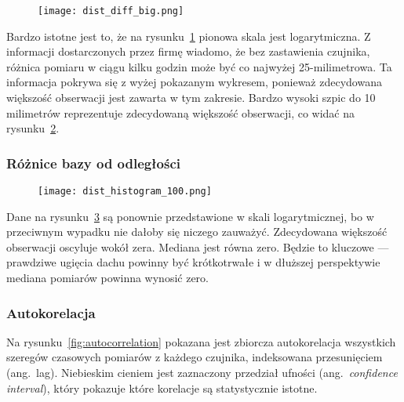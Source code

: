 \begin{figure}[h]
    \centering
    \texttt{[image: dist\_diff\_big.png]}
    \label{fig:distbig}
\end{figure}

Bardzo istotne jest to, że na rysunku~\ref{fig:distbig} pionowa skala jest logarytmiczna.
Z informacji dostarczonych przez firmę wiadomo, że bez zastawienia czujnika, różnica pomiaru w ciągu kilku godzin może być co najwyżej 25-milimetrowa.
Ta informacja pokrywa się z wyżej pokazanym wykresem, ponieważ zdecydowana większość obserwacji jest zawarta w tym zakresie.
Bardzo wysoki szpic do 10 milimetrów reprezentuje zdecydowaną większość obserwacji, co widać na rysunku~\ref{fig:diffsmall}.


\begin{figure}[h]
    \centering
    
    \label{fig:diffsmall}
\end{figure}

\subsubsection{Różnice bazy od odległości}
\begin{figure}[h]
    \texttt{[image: dist\_histogram\_100.png]}
    \label{fig:dist}
\end{figure}


Dane na rysunku~\ref{fig:dist} są ponownie przedstawione w skali logarytmicznej, bo w przeciwnym wypadku nie dałoby się niczego zauważyć.
Zdecydowana większość obserwacji oscyluje wokół zera.
Mediana jest równa zero.
Będzie to kluczowe — prawdziwe ugięcia dachu powinny być krótkotrwałe i w dłuższej perspektywie mediana pomiarów powinna wynosić zero.

\subsubsection{Autokorelacja}\label{subsubsec:autocorrelation}

Na rysunku~\ref{fig:autocorrelation} pokazana jest zbiorcza autokorelacja wszystkich szeregów czasowych pomiarów z każdego czujnika, indeksowana przesunięciem (ang.\ lag).
Niebieskim cieniem jest zaznaczony przedział ufności (ang.\ \emph{confidence interval}), który pokazuje które korelacje są statystycznie istotne.

